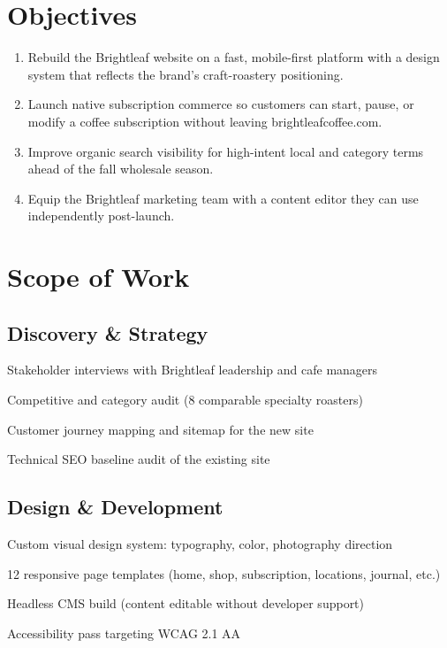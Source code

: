 \documentclass[11pt]{article}
\begin{document}
\clearpage

\section{Objectives}

\begin{enumerate}
  \item Rebuild the Brightleaf website on a fast, mobile-first platform with a design system
        that reflects the brand's craft-roastery positioning.
  \item Launch native subscription commerce so customers can start, pause, or modify a coffee
        subscription without leaving brightleafcoffee.com.
  \item Improve organic search visibility for high-intent local and category terms ahead of the
        fall wholesale season.
  \item Equip the Brightleaf marketing team with a content editor they can use independently
        post-launch.
\end{enumerate}

\section{Scope of Work}

\subsection{Discovery \& Strategy}
\begin{checklist}
  \item Stakeholder interviews with Brightleaf leadership and cafe managers
  \item Competitive and category audit (8 comparable specialty roasters)
  \item Customer journey mapping and sitemap for the new site
  \item Technical SEO baseline audit of the existing site
\end{checklist}

\subsection{Design \& Development}
\begin{checklist}
  \item Custom visual design system: typography, color, photography direction
  \item 12 responsive page templates (home, shop, subscription, locations, journal, etc.)
  \item Headless CMS build (content editable without developer support)
  \item Accessibility pass targeting WCAG 2.1 AA
\end{checklist}
\end{document}
